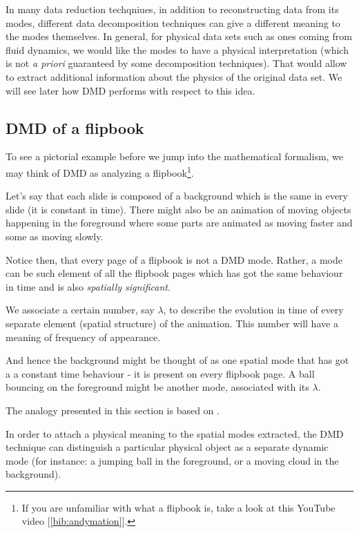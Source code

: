 \documentclass[10pt,twocolumn]{article}
\begin{document}
In many data reduction techqniues, in addition to reconstructing data from its modes, different data decomposition techniques can give a different meaning to the modes themselves. In general, for physical data sets such as ones coming from fluid dynamics, we would like the modes to have a physical interpretation (which is not \textit{a priori} guaranteed by some decomposition techniques). That would allow to extract additional information about the physics of the original data set. We will see later how DMD performs with respect to this idea. 


\subsection{DMD of a flipbook}

To see a pictorial example before we jump into the mathematical formalism, we may think of DMD as analyzing a flipbook\footnote{If you are unfamiliar with what a flipbook is, take a look at this YouTube video [\ref{bib:andymation}].}.

Let's say that each slide is composed of a background which is the same in every slide (it is constant in time). There might also be an animation of moving objects happening in the foreground where some parts are animated as moving faster and some as moving slowly.

Notice then, that every page of a flipbook is not a DMD mode. Rather, a mode can be such element of all the flipbook pages which has got the same behaviour in time and is also \textit{spatially significant}.

We associate a certain number, say $\lambda$, to describe the evolution in time of every separate element (spatial structure) of the animation. This number will have a meaning of frequency of appearance.

And hence the background might be thought of as one spatial mode that has got a a constant time behaviour - it is present on every flipbook page. A ball bouncing on the foreground might be another mode, associated with its $\lambda$. 

The analogy presented in this section is based on \cite{Grosek}.

In order to attach a physical meaning to the spatial modes extracted, the DMD technique can distinguish a particular physical object as a separate dynamic mode (for instance: a jumping ball in the foreground, or a moving cloud in the background).
\end{document}
